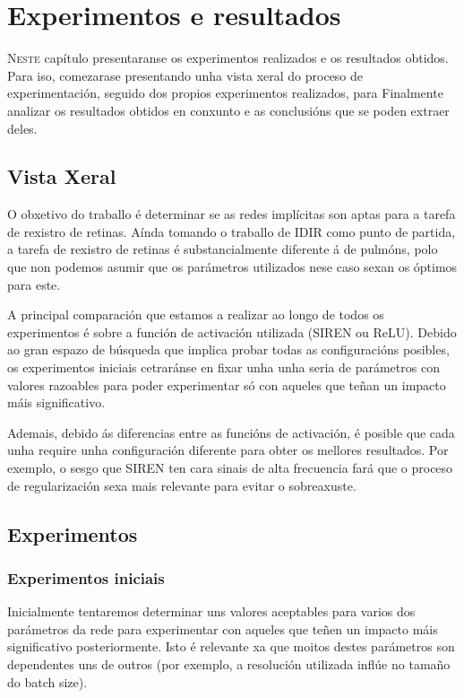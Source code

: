 \chapter{Experimentos e resultados}
\label{chap:Experimentos e resultados}
\lettrine{N}{este} capítulo presentaranse os experimentos realizados e os resultados obtidos.
Para iso, comezarase presentando unha vista xeral do proceso de experimentación, 
seguido dos propios experimentos realizados, para 
Finalmente analizar os resultados obtidos en conxunto e as conclusións que se poden extraer deles.

\section{Vista Xeral}
\label{sec:Vista Xeral}

O obxetivo do traballo é determinar se as redes implícitas son aptas para a tarefa de rexistro de retinas.
Aínda tomando o traballo de IDIR como punto de partida, a tarefa de rexistro de retinas é substancialmente diferente á de pulmóns, polo que non podemos asumir que os parámetros utilizados nese caso sexan os óptimos para este.

A principal comparación que estamos a realizar ao longo de todos os experimentos é sobre a función de activación utilizada (SIREN ou ReLU).
Debido ao gran espazo de búsqueda que implica probar todas as configuracións posibles, 
os experimentos iniciais cetraránse en fixar unha unha seria de parámetros con valores razoables para poder experimentar só con aqueles que teñan un impacto máis significativo.

Ademais, debido ás diferencias entre as funcións de activación, é posible que cada unha require unha configuración diferente para obter os mellores resultados.
Por exemplo, o sesgo que SIREN ten cara sinais de alta frecuencia fará que o proceso de regularización sexa mais relevante para evitar o sobreaxuste.

\section{Experimentos}
\label{sec:Experimentos}

\subsection{Experimentos iniciais}
\label{subsec:Experimentos iniciais}

Inicialmente tentaremos determinar uns valores aceptables para varios dos parámetros da rede para experimentar con aqueles que teñen un impacto máis significativo posteriormente.
Isto é relevante xa que moitos destes parámetros son dependentes uns de outros (por exemplo, a resolución utilizada inflúe no tamaño do batch size).


